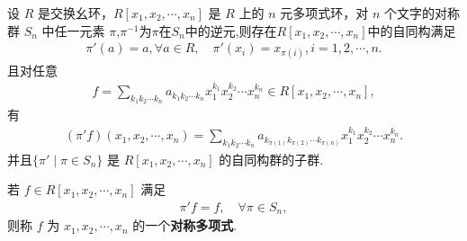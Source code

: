 \documentclass[../../main.tex]{subfiles}%
\begin{document}
\begin{theorem}\label{theorem:对称多项式和pi'}
设 \( R \) 是交换幺环，\( R[x_1, x_2, \cdots, x_n] \) 是 \( R \) 上的 \( n \) 元多项式环，对 \( n \) 个文字的对称群 \( S_n \) 中任一元素 \( \pi \),$\pi^{-1}$为$\pi$在$S_n$中的逆元,则存在$R[x_1, x_2, \cdots, x_n]$中的自同构满足
\begin{align*}
\pi'(a) = a, \forall a \in R, \quad \pi'(x_i) = x_{\pi(i)}, i = 1, 2, \cdots, n.
\end{align*}
且对任意
\begin{align*}
f = \sum\limits_{k_1k_2\cdots k_n} a_{k_1k_2\cdots k_n} x_1^{k_1} x_2^{k_2} \cdots x_n^{k_n}\in R[x_1,x_2,\cdots,x_n],
\end{align*}
有
\begin{align*}
(\pi' f)(x_1,x_2,\cdots ,x_n)=\sum_{k_1k_2\cdots k_n}{a_{k_{\pi (1)}k_{\pi (2)}\cdots k_{\pi (n)}}x_{1}^{k_1}x_{2}^{k_2}}\cdots x_{n}^{k_n}.
\end{align*}
并且\( \{\pi' \mid \pi \in S_n\} \) 是 \( R[x_1, x_2, \cdots, x_n] \) 的自同构群的子群.

若 \( f \in R[x_1, x_2, \cdots, x_n] \) 满足
\begin{align*}
\pi' f = f, \quad \forall \pi \in S_n,
\end{align*}
则称 \( f \) 为 \( x_1, x_2, \cdots, x_n \) 的一个\textbf{对称多项式}.
\end{theorem}
\end{document}
